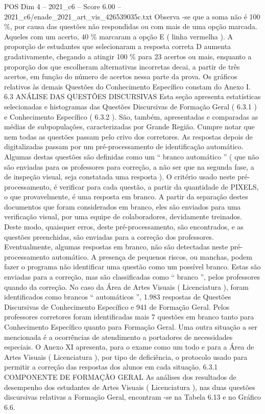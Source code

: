 \begin{textsample}{POS Dim 4 – 2021\_c6 – Score 6.00 – 2021\_c6/enade\_2021\_art\_vis\_426539035c.txt}
Observa -se que a soma não é 100 \%, por causa das questões não respondidas ou com mais de uma opção marcada.
Aqueles com um acerto, 40 \% marcaram a opção E ( linha vermelha ).
A proporção de estudantes que selecionaram a resposta correta D aumenta gradativamente, chegando a atingir 100 \% para 23 acertos ou mais, enquanto a proporção dos que escolheram alternativas incorretas decai, a partir de três acertos, em função do número de acertos nessa parte da prova.
Os gráficos relativos às demais Questões do Conhecimento Específico constam do Anexo I. 6.3 ANÁLISE DAS QUESTÕES DISCURSIVAS Esta seção apresenta estatísticas selecionadas e histogramas das Questões Discursivas de Formação Geral ( 6.3.1 ) e Conhecimento Específico ( 6.3.2 ).
São, também, apresentadas e comparadas as médias de subpopulações, caracterizadas por Grande Região.
Cumpre notar que nem todas as questões passam pelo crivo dos corretores.
As respostas depois de digitalizadas passam por um pré-processamento de identificação automático.
Algumas destas questões são definidas como um “ branco automático ” ( que não são enviadas para os professores para correção, a não ser que na segunda fase, a de inspeção visual, seja constatada uma resposta ).
O critério usado neste pré-processamento, é verificar para cada questão, a partir da quantidade de PIXELS, o que provavelmente, é uma resposta em branco.
A partir da separação destes documentos que foram considerados em branco, eles são enviados para uma verificação visual, por uma equipe de colaboradores, devidamente treinados.
Deste modo, quaisquer erros, deste pré-processamento, são encontrados, e as questões preenchidas, são enviadas para a correção dos professores.
Eventualmente, algumas respostas em branco, não são detectadas neste pré-processamento automático.
A presença de pequenos riscos, ou manchas, podem fazer o programa não identificar uma questão como um possível branco.
Estas são enviadas para a correção, mas são classificadas como “ branco ”, pelos professores quando da correção.
No caso da Área de Artes Visuais ( Licenciatura ), foram identificados como brancos “ automáticos ”, 1.983 respostas de Questões Discursivas de Conhecimento Específico e 941 de Formação Geral.
Pelos professores corretores foram identificadas mais 7 questões em branco tanto para Conhecimento Específico quanto para Formação Geral.
Uma outra situação a ser mencionada é a ocorrências de atendimento a portadores de necessidades especiais.
O Anexo XI apresenta, para o exame como um todo e para a Área de Artes Visuais ( Licenciatura ), por tipo de deficiência, o protocolo usado para permitir a correção das respostas dos alunos em cada situação. 6.3.1 COMPONENTE DE FORMAÇÃO GERAL As análises dos resultados de desempenho dos estudantes de Artes Visuais ( Licenciatura ), nas duas questões discursivas relativas a Formação Geral, encontram -se na Tabela 6.13 e no Gráfico 6.6.

\end{textsample}
